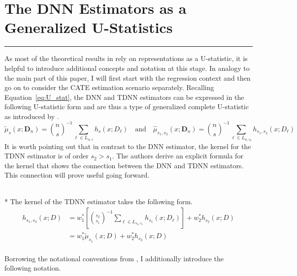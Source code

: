 \section{The DNN Estimators as a Generalized U-Statistics}
\hrule

As most of the theoretical results in \citet{demirkaya_optimal_2024} rely on representations as a U-statistic, it is helpful to introduce additional concepts and notation at this stage.
In analogy to the main part of this paper, I will first start with the regression context and then go on to consider the CATE estimation scenario separately.
Recalling Equation~\ref{eq:U_stat}, the DNN and TDNN estimators can be expressed in the following U-statistic form and are thus a type of generalized complete U-statistic as introduced by \citet{peng_rates_2022}.
\begin{equation}
	\tilde{\mu}_{s}(x; \mathbf{D}_n)
	= \binom{n}{s}^{-1} \sum_{\ell \in L_{n,s}} h_{s}(x; D_{\ell})
	\quad \text{and} \quad
	\hat{\mu}_{s_1, s_2}(x; \mathbf{D}_n)
	= \binom{n}{s}^{-1} \sum_{\ell \in L_{n,s_2}} h_{s_1, s_2}(x; D_{\ell})
\end{equation}
It is worth pointing out that in contrast to the DNN estimator, the kernel for the TDNN estimator is of order $s_2 > s_1$.
The authors derive an explicit formula for the kernel that shows the connection between the DNN and TDNN estimators.
This connection will prove useful going forward.
\begin{boxD}
	\begin{lem}\label{lem:dem8}\mbox{}\\*
		The kernel of the TDNN estimator takes the following form.
		\begin{equation}
			\begin{aligned}
				h_{s_1, s_2}\left(x; D\right)
				 & = w_{1}^{*}\left[\binom{s_2}{s_1}^{-1}\sum_{\ell \in L_{s_2, s_1}} h_{s_1}\left(x; D_{\ell}\right)\right] + w_{2}^{*} h_{s_2}\left(x; D\right) \\
				 & = w_{1}^{*} \tilde{\mu}_{s_1}\left(x; D\right) + w_{2}^{*} h_{s_2}\left(x; D\right)                                                            \\
			\end{aligned}
		\end{equation}
	\end{lem}
\end{boxD}
Borrowing the notational conventions from \citet{lee_u-statistics_2019}, I additionally introduce the following notation.
